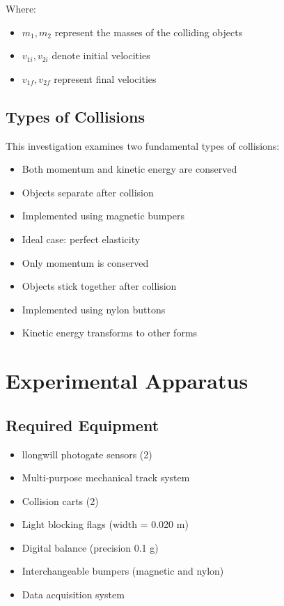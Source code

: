 \documentclass[12pt]{article}
\newcommand{\conceptbox}[2]{
    \begin{tcolorbox}[colback=blue!5,colframe=blue!40,title={\textbf{#1}}]
        #2
    \end{tcolorbox}
}
\begin{document}
Where:
\begin{itemize}
    \item $m_1, m_2$ represent the masses of the colliding objects
    \item $v_{1i}, v_{2i}$ denote initial velocities
    \item $v_{1f}, v_{2f}$ represent final velocities
\end{itemize}

\subsection{Types of Collisions}
This investigation examines two fundamental types of collisions:

\conceptbox{Elastic Collisions}{
\begin{itemize}
    \item Both momentum and kinetic energy are conserved
    \item Objects separate after collision
    \item Implemented using magnetic bumpers
    \item Ideal case: perfect elasticity
\end{itemize}
}

\conceptbox{Inelastic Collisions}{
\begin{itemize}
    \item Only momentum is conserved
    \item Objects stick together after collision
    \item Implemented using nylon buttons
    \item Kinetic energy transforms to other forms
\end{itemize}
}

\section{Experimental Apparatus}

\subsection{Required Equipment}
\begin{itemize}
    \item llongwill\textsuperscript{\textregistered} photogate sensors (2)
    \item Multi-purpose mechanical track system
    \item Collision carts (2)
    \item Light blocking flags (width = 0.020 m)
    \item Digital balance (precision 0.1 g)
    \item Interchangeable bumpers (magnetic and nylon)
    \item Data acquisition system
\end{itemize}
\end{document}
